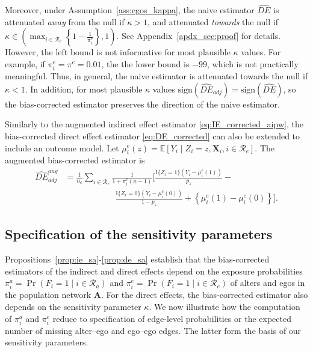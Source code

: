 \documentclass[11pt]{article}
\theoremstyle{definition}
\def \bA {\boldsymbol{A}}
\def \bX {\boldsymbol{X}}
\def \cR {\mathcal{R}}
\def \EX {\mathbb{E}}
\begin{document}
Moreover, under Assumption~\ref{ass:egos_kappa}, the naive estimator $\widehat{DE}$ is
 attenuated \emph{away} from the null if $\kappa >1$, and attenuated \emph{towards} the null if
   $\kappa \in \left( \max_{i \in \cR_e}\left\{1 - \frac{1}{\pi_i^e}\right\}, 1 \right)$. 
   See Appendix~\ref{apdx_sec:proof} for details.
However, the left bound is not informative for most plausible $\kappa$ values.
For example, if $\pi_i^e = \pi^e = 0.01$, the the lower bound is $-99$,
which is not practically meaningful. 
Thus, in general, the naive estimator is attenuated towards the null if $\kappa <1$.
In addition, for most plausible $\kappa$ values 
    $\text{sign}\left(\widehat{DE}_{adj}\right) = \text{sign}\left(\widehat{DE}\right)$,
so the bias-corrected estimator preserves the direction of the naive estimator.

Similarly to the augmented indirect effect estimator \eqref{eq:IE_corrected_aipw},
the bias-corrected direct effect estimator \eqref{eq:DE_corrected} 
can also be extended to include an outcome model.
Let $\mu^e_i(z) = \EX \left[Y_i \mid Z_i =z, \bX_i, i \in \cR_e \right]$.
The augmented bias-corrected estimator is
\begin{equation}
    \label{eq:DE_corrected_aipw}
    \begin{aligned}
        \widehat{DE}_{adj}^{aug} 
        &= 
        \frac{1}{n_e}
        \sum_{i \in \cR_e}
        \frac{1}{1 + \pi_i^e(\kappa-1)}
        \Bigg[
        \frac{
        \mathbb{I}\{
        Z_i=1\}\left(Y_i - \mu^e_i(1) \right)}{p_z} 
        -
        \\ &\qquad \qquad \qquad
        \frac{
        \mathbb{I}\{Z_i=0\}\left(Y_i - \mu^e_i(0) \right)}{1 - p_z} 
        + \left\{\mu^e_i(1) - \mu^e_i(0) \right\}
        \Bigg].
    \end{aligned}
\end{equation}

\subsection{Specification of the sensitivity parameters}
\label{subsec:rho_param}
Propositions~\ref {prop:ie_sa}-\ref{prop:de_sa} establish that the bias-corrected estimators
of the indirect and direct effects depend on the exposure probabilities
$\pi_i^a = \Pr(F_i=1\mid i\in \cR_a)$ and $\pi_i^e = \Pr(F_i=1 \mid i \in \cR_e)$ 
of alters and egos in the population network $\bA$. 
For the direct effects, the bias-corrected estimator also depends on the sensitivity parameter $\kappa$. 
We now illustrate how the computation of $\pi_i^a$ and $\pi_i^e$
reduce to specification of edge-level probabilities or the expected number
  of missing alter--ego and ego--ego edges. 
  The latter form the basis of our sensitivity parameters.
\end{document}
